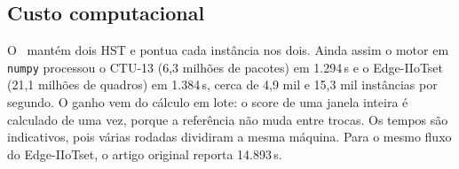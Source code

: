 \subsection{Custo computacional}
O \modusp\ mantém dois HST e pontua cada instância nos dois. Ainda assim o motor em \texttt{numpy}
processou o CTU-13 (6,3 milhões de pacotes) em 1.294\,s e o Edge-IIoTset (21,1 milhões de quadros)
em 1.384\,s, cerca de 4,9 mil e 15,3 mil instâncias por segundo. O ganho vem do cálculo em lote: o
score de uma janela inteira é calculado de uma vez, porque a referência não muda entre trocas. Os
tempos são indicativos, pois várias rodadas dividiram a mesma máquina. Para o mesmo fluxo do
Edge-IIoTset, o artigo original reporta 14.893\,s.
